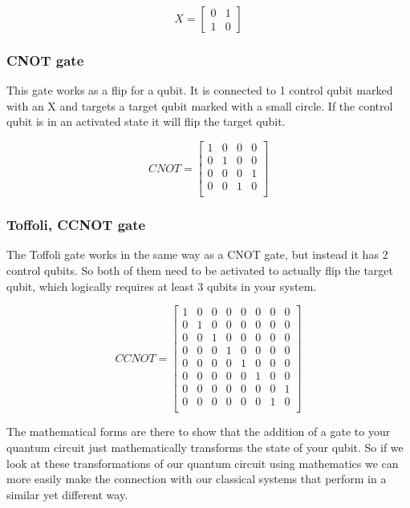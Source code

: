 \[
X=
\begin{bmatrix}
0 & 1 \\
1 & 0
\end{bmatrix}
\]

\subsubsection{CNOT gate}
This gate works as a flip for a qubit. It is connected to 1 control qubit marked with an X and targets a target qubit marked with a small circle. If the control qubit is in an activated state it will flip the target qubit.

 \[
 CNOT=
 \begin{bmatrix}
 1 & 0 & 0 & 0 \\
 0 & 1 & 0 & 0 \\
 0 & 0 & 0 & 1 \\
 0 & 0 & 1 & 0 \\	
 \end{bmatrix}
 \]

\subsubsection{Toffoli, CCNOT gate}
The Toffoli gate works in the same way as a CNOT gate, but instead it has 2 control qubits. So both of them need to be activated to actually flip the target qubit, which logically requires at least 3 qubits in your system.

 \[
CCNOT=
\begin{bmatrix}
1 & 0 & 0 & 0 & 0 & 0 & 0 & 0\\
0 & 1 & 0 & 0 & 0 & 0 & 0 & 0\\
0 & 0 & 1 & 0 & 0 & 0 & 0 &  0\\
0 & 0 & 0 & 1 & 0 & 0 & 0  & 0\\
0 & 0 & 0 & 0 & 1 & 0 & 0  & 0\\
0 & 0 & 0 & 0 & 0 & 1 & 0  & 0\\
0 & 0 & 0 & 0 & 0 & 0 & 0 & 1 \\
0 & 0 & 0 & 0 & 0 & 0 & 1 & 0\\
\end{bmatrix}
\]

The mathematical forms are there to show that the addition of a gate to your quantum circuit just mathematically transforms the state of your qubit. So if we look at these transformations of our quantum circuit using mathematics we can more easily make the connection with our classical systems that perform in a similar yet different way.

